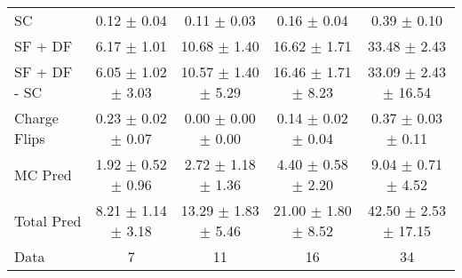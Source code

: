 \begin{tabular}{l|cccc}
                                 SC &  0.12 $\pm$  0.04 &  0.11 $\pm$  0.03 &  0.16 $\pm$  0.04 &  0.39 $\pm$  0.10 \\
                            SF + DF &  6.17 $\pm$  1.01 & 10.68 $\pm$  1.40 & 16.62 $\pm$  1.71 & 33.48 $\pm$  2.43 \\
\hline
                       SF + DF - SC &  6.05 $\pm$  1.02 $\pm$  3.03 & 10.57 $\pm$  1.40 $\pm$  5.29 & 16.46 $\pm$  1.71 $\pm$  8.23 & 33.09 $\pm$  2.43 $\pm$ 16.54 \\
\hline\hline
                       Charge Flips &  0.23 $\pm$  0.02 $\pm$  0.07 &  0.00 $\pm$  0.00 $\pm$  0.00 &  0.14 $\pm$  0.02 $\pm$  0.04 &  0.37 $\pm$  0.03 $\pm$  0.11 \\
\hline
                            MC Pred &  1.92 $\pm$  0.52 $\pm$  0.96 &  2.72 $\pm$  1.18 $\pm$  1.36 &  4.40 $\pm$  0.58 $\pm$  2.20 &  9.04 $\pm$  0.71 $\pm$  4.52 \\
\hline
                         Total Pred &  8.21 $\pm$  1.14 $\pm$  3.18 & 13.29 $\pm$  1.83 $\pm$  5.46 & 21.00 $\pm$  1.80 $\pm$  8.52 & 42.50 $\pm$  2.53 $\pm$ 17.15 \\
\hline\hline
                               Data &     7 &    11 &    16 &    34 \\
\hline\hline
\end{tabular}

